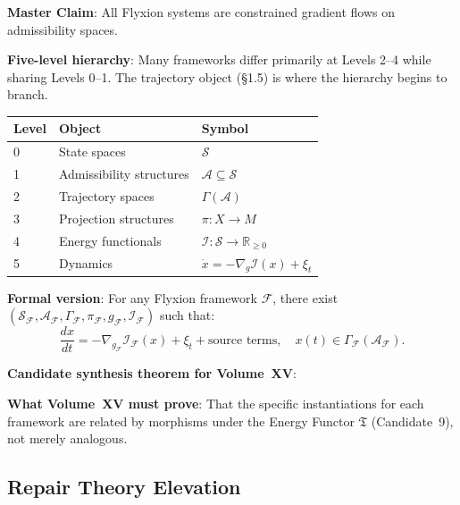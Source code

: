 \documentclass[11pt, a4paper]{article}
\begin{document}
\begin{candbox}
\textbf{Master Claim}: All Flyxion systems are constrained gradient
flows on admissibility spaces.

\medskip
\textbf{Five-level hierarchy}: Many frameworks differ primarily at
Levels 2--4 while sharing Levels 0--1. The trajectory object (§1.5)
is where the hierarchy begins to branch.

\medskip
\begin{tabular}{lll}
\textbf{Level} & \textbf{Object} & \textbf{Symbol} \\
\hline
0 & State spaces & $\mathcal{S}$ \\
1 & Admissibility structures & $\mathcal{A} \subseteq \mathcal{S}$ \\
2 & Trajectory spaces & $\Gamma(\mathcal{A})$ \\
3 & Projection structures & $\pi: X \to M$ \\
4 & Energy functionals & $\mathcal{I}: \mathcal{S} \to \mathbb{R}_{\geq 0}$ \\
5 & Dynamics & $\dot{x} = -\nabla_g \mathcal{I}(x) + \xi_t$ \\
\end{tabular}

\medskip
\textbf{Formal version}: For any Flyxion framework $\mathcal{F}$,
there exist $(\mathcal{S}_\mathcal{F}, \mathcal{A}_\mathcal{F},
\Gamma_\mathcal{F}, \pi_\mathcal{F}, g_\mathcal{F},
\mathcal{I}_\mathcal{F})$ such that:
\[
  \frac{dx}{dt} = -\nabla_{g_\mathcal{F}} \mathcal{I}_\mathcal{F}(x)
  + \xi_t + \text{source terms},
  \quad x(t) \in \Gamma_\mathcal{F}(\mathcal{A}_\mathcal{F}).
\]

\medskip
\textbf{Candidate synthesis theorem for Volume~XV}:

\begin{center}
\end{center}

\medskip
\textbf{What Volume~XV must prove}: That the specific instantiations
for each framework are related by morphisms under the Energy Functor
$\mathfrak{T}$ (Candidate~9), not merely analogous.
\end{candbox}

\subsection{Repair Theory Elevation}
\end{document}
